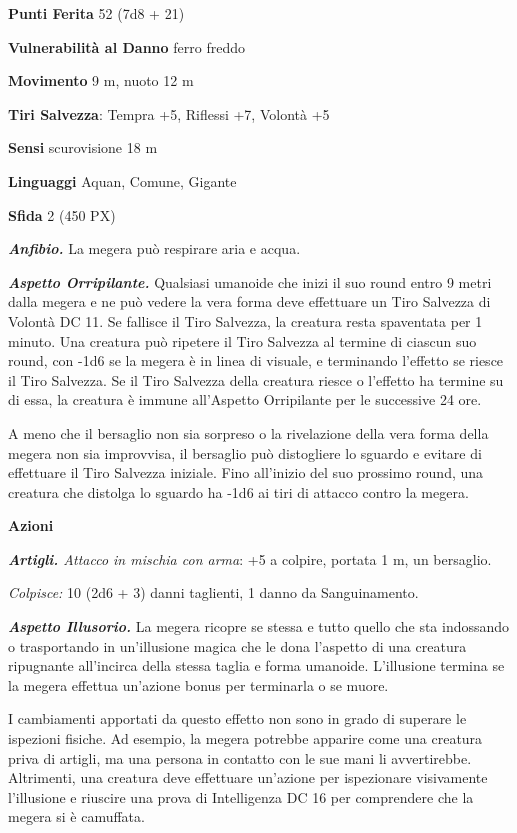 \begin{multicols}{2}
\textbf{Punti Ferita} 52 (7d8 + 21)

\textbf{Vulnerabilità al Danno} ferro freddo

\textbf{Movimento} 9 m, nuoto 12 m

\textbf{Tiri Salvezza}: Tempra +5, Riflessi +7, Volontà +5

\textbf{Sensi} scurovisione 18 m

\textbf{Linguaggi} Aquan, Comune, Gigante

\textbf{Sfida} 2 (450 PX)

\textit{\textbf{Anfibio.}} La megera può respirare aria e acqua.

\textit{\textbf{Aspetto Orripilante.}} Qualsiasi umanoide che inizi il suo round entro 9 metri dalla megera e ne può vedere la vera forma deve effettuare un Tiro Salvezza di Volontà DC 11. Se fallisce il Tiro Salvezza, la creatura resta spaventata per 1 minuto. Una creatura può ripetere il Tiro Salvezza al termine di ciascun suo round, con -1d6 se la megera è in linea di visuale, e terminando l'effetto se riesce il Tiro Salvezza. Se il Tiro Salvezza della creatura riesce o l'effetto ha termine su di essa, la creatura è immune all'Aspetto Orripilante per le successive 24 ore.

A meno che il bersaglio non sia sorpreso o la rivelazione della vera forma della megera non sia improvvisa, il bersaglio può distogliere lo sguardo e evitare di effettuare il Tiro Salvezza iniziale. Fino all'inizio del suo prossimo round, una creatura che distolga lo sguardo
ha -1d6 ai tiri di attacco contro la megera.

\textbf{Azioni}

\textit{\textbf{Artigli.} Attacco in mischia con arma}: +5 a colpire, portata 1 m, un bersaglio.

\textit{Colpisce:} 10 (2d6 + 3) danni taglienti, 1 danno da Sanguinamento.

\textit{\textbf{Aspetto Illusorio.}} La megera ricopre se stessa e tutto quello che sta indossando o trasportando in un'illusione magica che le dona l'aspetto di una creatura ripugnante all'incirca della stessa taglia e forma umanoide. L'illusione termina se la megera effettua un'azione bonus per terminarla o se muore.

I cambiamenti apportati da questo effetto non sono in grado di superare le ispezioni fisiche. Ad esempio, la megera potrebbe apparire come una creatura priva di artigli, ma una persona in contatto con le sue mani li avvertirebbe. Altrimenti, una creatura deve effettuare un'azione per ispezionare visivamente l'illusione e riuscire una prova di Intelligenza DC 16 per comprendere che la megera si è camuffata.


\end{multicols}
